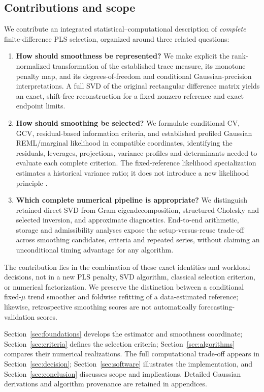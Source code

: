 \subsection{Contributions and scope}\label{sec:contributions}
We contribute an integrated statistical--computational
description of \emph{complete} finite-difference PLS selection,
organized around three related questions:

\begin{enumerate}[leftmargin=*,label=\textbf{\arabic*.},itemsep=3pt]
\item \textbf{How should smoothness be represented?}
We make explicit the rank-normalized transformation of the
established trace measure, its monotone penalty map, and its
degrees-of-freedom and conditional Gaussian-precision
interpretations.  A full SVD of the original rectangular
difference matrix yields an exact, shift-free reconstruction
for a fixed nonzero reference and exact endpoint limits.

\item \textbf{How should smoothing be selected?}
We formulate conditional CV, GCV, residual-based information
criteria, and established profiled Gaussian
REML/marginal likelihood in compatible coordinates,
identifying the residuals, leverages, projections, variance
profiles and determinants needed to evaluate each
complete criterion.  The fixed-reference likelihood
specialization estimates a historical variance ratio;
it does not introduce a new likelihood principle
\citep{patterson1971,wahba1985,wood2011,biessy2026}.

\item \textbf{Which complete numerical pipeline is appropriate?}
We distinguish retained direct SVD from Gram
eigendecomposition, structured Cholesky and selected
inversion, and approximate diagnostics.  End-to-end
arithmetic, storage and admissibility analyses expose the
setup-versus-reuse trade-off across smoothing candidates,
criteria and repeated series, without claiming an
unconditional timing advantage for any algorithm.
\end{enumerate}

The contribution lies in the combination of these exact
identities and workload decisions, not in a new PLS
penalty, SVD algorithm, classical selection criterion,
or numerical factorization.  We preserve the
distinction between a conditional fixed-$\mu$ trend smoother
and foldwise refitting of a data-estimated reference;
likewise, retrospective smoothing scores are not
automatically forecasting-validation scores.

Section~\ref{sec:foundations} develops the estimator and
smoothness coordinate; Section~\ref{sec:criteria} defines
the selection criteria; Section~\ref{sec:algorithms}
compares their numerical realizations.  The full
computational trade-off appears in
Section~\ref{sec:decision}; Section~\ref{sec:software}
illustrates the implementation, and
Section~\ref{sec:conclusion} discusses scope and
implications.  Detailed Gaussian derivations and
algorithm provenance are retained in appendices.
